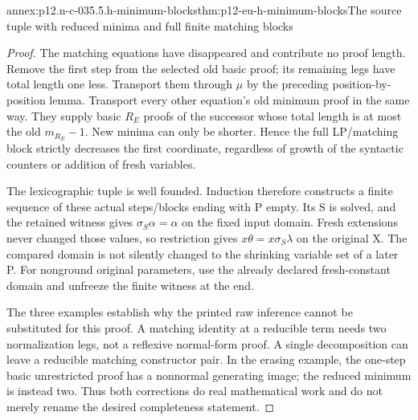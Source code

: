 \begin{annexitem}{annex:p12.n-c-035.5.h-minimum-blocks}{thm:p12-eu-h-minimum-blocks}{The source tuple with reduced minima and full finite matching blocks}
\begin{proof}
The matching equations have disappeared and contribute no proof
length. Remove the first step from the selected old basic proof;
its remaining legs have total length one less. Transport them
through \(\mu\) by the preceding position-by-position lemma.
Transport every other equation's old minimum proof in the same
way. They supply basic \(R_E\) proofs of the successor
whose total length is at most the old \(m_{R_E}-1\).
New minima can only be shorter. Hence the full LP/matching block
strictly decreases the first coordinate, regardless of growth
of the syntactic counters or addition of fresh variables.

The lexicographic tuple is well founded. Induction therefore
constructs a finite sequence of these actual steps/blocks ending
with P empty. Its S is solved, and the retained witness gives
\(\sigma_S\alpha=\alpha\) on the fixed input domain.
Fresh extensions never changed those values, so restriction
gives \(x\theta=x\sigma_S\lambda\) on the original X.
The compared domain is not silently changed to the shrinking
variable set of a later P. For nonground original parameters,
use the already declared fresh-constant domain and unfreeze
the finite witness at the end.

The three examples establish why the printed raw inference
cannot be substituted for this proof. A matching identity at
a reducible term needs two normalization legs, not a reflexive
normal-form proof. A single decomposition can leave a reducible
matching constructor pair. In the erasing example, the one-step
basic unrestricted proof has a nonnormal generating image;
the reduced minimum is instead two. Thus both corrections do
real mathematical work and do not merely rename the desired
completeness statement.
\end{proof}
\end{annexitem}

